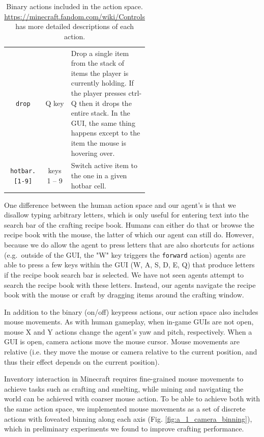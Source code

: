 \begin{table}[htpb]
\begin{center}
\begin{tabular}{ |c|c|p{0.55\linewidth}| }
 \texttt{drop} & Q key & Drop a single item from the stack of items the player is currently holding. If the player presses ctrl-Q then it drops the entire stack. In the GUI, the same thing happens except to the item the mouse is hovering over. \\
 
 \texttt{hotbar.[1-9]} & keys 1 -- 9 & Switch active item to the one in a given hotbar cell. \\
\hline
\end{tabular}
\end{center}
\caption{\label{table:binary_actions}Binary actions included in the action space. \url{https://minecraft.fandom.com/wiki/Controls} has more detailed descriptions of each action.}
\end{table}

One difference between the human action space and our agent's is that we disallow typing arbitrary letters, which is only useful for entering text into the search bar of the crafting recipe book. Humans can either do that or browse the recipe book with the mouse, the latter of which our agent can still do. However, because we do allow the agent to press letters that are also shortcuts for actions (e.g.\ outside of the GUI, the "W" key triggers the \texttt{forward} action) agents are able to press a few keys within the GUI (W, A, S, D, E, Q) that produce letters if the recipe book search bar is selected. We have not seen agents attempt to search the recipe book with these letters. Instead, our agents navigate the recipe book with the mouse or craft by dragging items around the crafting window. 

In addition to the binary (on/off) keypress actions, our action space also includes mouse movements. As with human gameplay, when in-game GUIs are not open, mouse X and Y actions change the agent's yaw and pitch, respectively. When a GUI is open, camera actions move the mouse cursor. Mouse movements are relative (i.e. they move the mouse or camera relative to the current position, and thus their effect depends on the current position).

Inventory interaction in Minecraft requires fine-grained mouse movements to achieve tasks such as crafting and smelting, while mining and navigating the world can be achieved with coarser mouse action. To be able to achieve both with the same action space, we implemented mouse movements as a set of discrete actions with foveated binning along each axis (Fig. \ref{fig:a_1_camera_binning}), which in preliminary experiments we found to improve crafting performance.

